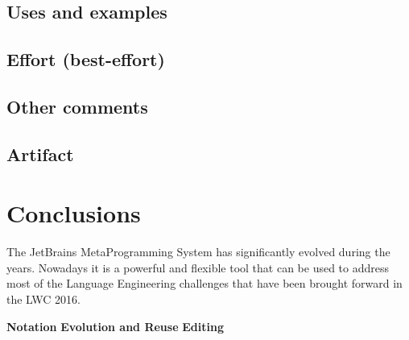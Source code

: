 \documentclass[preprint,numbers,10pt]{sigplanconf}
\begin{document}
\subsection{Uses and examples}

\subsection{Effort (best-effort)}

\subsection{Other comments}

\subsection{Artifact}

%
%

\section{Conclusions}

The JetBrains MetaProgramming System has significantly evolved during the years. Nowadays it is a powerful and flexible tool that can be used to address most of the Language Engineering challenges that have been brought forward in the LWC 2016.

\textbf{Notation}
\textbf{Evolution and Reuse}
\textbf{Editing}



\end{document}

